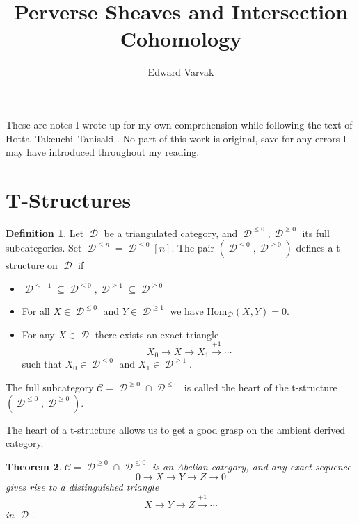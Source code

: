 \documentclass[12pt]{amsart}
\title{Perverse Sheaves and Intersection Cohomology}
\author{Edward Varvak}
\newcommand{\Hom}{\text{Hom}}
\DeclareMathOperator{\D}{\mathcal{D}}
\newtheorem{theorem}{Theorem}[section]
\theoremstyle{definition}
\newtheorem{definition}[theorem]{Definition}
\theoremstyle{remark}
\numberwithin{equation}{section}
\begin{document}
\maketitle

These are notes I wrote up for my own comprehension while following the text of
Hotta--Takeuchi--Tanisaki \cite{HTT}. No part of this work is original, save for 
any errors I may have introduced throughout my reading.

\section{T-Structures}
\begin{definition}
    Let $\D$ be a triangulated category, and $\D^{\leq 0}, \D^{\geq 0}$ its full subcategories. Set $\D^{\leq n} = \D^{\leq 0}[n]$. The pair $(\D^{\leq 0}, \D^{\geq 0})$ defines a t-structure on $\D$ if
    \begin{itemize}
        \item $\D^{\leq -1} \subseteq \D^{\leq 0}, \D^{\geq 1} \subseteq \D^{\geq 0}$
        \item For all $X \in \D^{\leq 0}$ and $Y \in \D^{\geq 1}$ we have $\Hom_{\D}(X, Y) = 0.$
        \item For any $X \in \D$ there exists an exact triangle
        \begin{equation}
            X_0 \to X \to X_1 \overset{+1}{\to} \cdots
        \end{equation}
        such that $X_0 \in \D^{\leq 0}$ and $X_1 \in \D^{\geq 1}$.
    \end{itemize}
    The full subcategory $\mathcal{C} = \D^{\geq 0} \cap \D^{\leq 0}$ is called the heart of the t-structure $(\D^{\leq 0}, \D^{\geq 0})$.
\end{definition}

The heart of a t-structure allows us to get a good grasp on the ambient derived category.
\begin{theorem}
    $\mathcal{C} = \D^{\geq 0} \cap \D^{\leq 0}$ is an Abelian category, and any exact sequence
    \begin{equation*}
        0 \to X \to Y \to Z \to 0
    \end{equation*}
    gives rise to a distinguished triangle
    \begin{equation*}
        X \to Y \to Z \overset{+1}{\to} \cdots
    \end{equation*}
    in $\D$.
\end{theorem}
\end{document}
